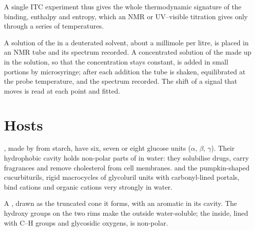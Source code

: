 A single ITC experiment thus gives the whole thermodynamic signature of the
binding, enthalpy and entropy, which an NMR or UV--visible titration gives only
through a series of temperatures.

\begin{inthelab}
A solution of the  in a deuterated solvent, about a millimole per litre,
is placed in an NMR tube and its spectrum recorded. A concentrated solution of
the  made up in the  solution, so that the  concentration stays
constant, is added in small portions by microsyringe; after each addition the
tube is shaken, equilibrated at the probe temperature, and the spectrum
recorded. The shift of a  signal that moves is read at each point and
fitted.
\end{inthelab}

\section{Hosts}

, made by  from starch, have six, seven or eight glucose
units ($\alpha$, $\beta$, $\gamma$). Their hydrophobic cavity holds non-polar parts of  in
water: they solubilise drugs, carry fragrances and remove cholesterol from
cell membranes.  and the pumpkin-shaped cucurbiturils, rigid
macrocycles of glycoluril units with carbonyl-lined portals, bind cations and
organic cations very strongly in water.

\begin{omfigure}

{\small A , drawn as the truncated cone it forms, with an aromatic
 in its cavity. The hydroxy groups on the two rims make the outside
water-soluble; the inside, lined with C--H groups and glycosidic oxygens, is
non-polar.}
\end{omfigure}

